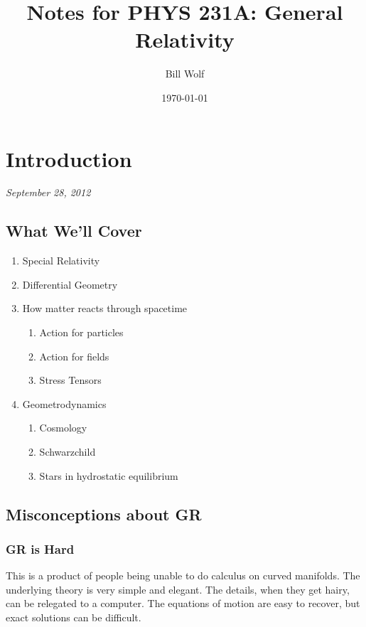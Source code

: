 \documentclass[10pt]{article}
\title{Notes for PHYS 231A: General Relativity}
\author{Bill Wolf}
\date{\today}
\begin{document}
\vfill\maketitle\vfill \newpage

\tableofcontents \newpage


\section{Introduction}
	\emph{September 28, 2012}
	\subsection{What We'll Cover} %
	\label{sub:what_we_ll_cover}
		\begin{enumerate}
			\item Special Relativity
			\item Differential Geometry
			\item How matter reacts through spacetime
			\begin{enumerate}
				\item Action for particles
				\item Action for fields
				\item Stress Tensors
			\end{enumerate}
			\item Geometrodynamics
			\begin{enumerate}
				\item Cosmology
				\item Schwarzchild
				\item Stars in hydrostatic equilibrium
			\end{enumerate}
		\end{enumerate}
	\subsection{Misconceptions about GR} %
	\label{sub:misconceptions_about_gr}
		\subsubsection{GR is Hard} %
		\label{ssub:gr_is_hard}
		This is a product of people being unable to do calculus on curved manifolds. The underlying theory is very simple and elegant. The details, when they get hairy, can be relegated to a computer. The equations of motion are easy to recover, but exact solutions can be difficult.
\end{document}
